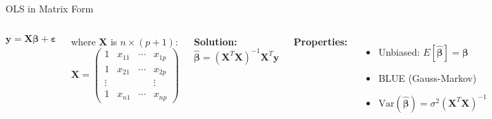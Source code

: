 \documentclass[aspectratio=169, 11pt]{beamer}
\begin{document}
\begin{frame}{OLS in Matrix Form}
\begin{columns}
$$\mathbf{y} = \mathbf{X}\boldsymbol{\beta} + \boldsymbol{\varepsilon}$$

\vspace{0.3em}
where $\mathbf{X}$ is $n \times (p+1)$:
$$\mathbf{X} = \begin{pmatrix} 1 & x_{11} & \cdots & x_{1p} \\ 1 & x_{21} & \cdots & x_{2p} \\ \vdots & & & \vdots \\ 1 & x_{n1} & \cdots & x_{np} \end{pmatrix}$$

\textbf{Solution:}
$$\hat{\boldsymbol{\beta}} = (\mathbf{X}^T\mathbf{X})^{-1}\mathbf{X}^T\mathbf{y}$$

\vspace{0.5em}
\textbf{Properties:}
\begin{itemize}
  \item Unbiased: $E[\hat{\boldsymbol{\beta}}] = \boldsymbol{\beta}$
  \item BLUE (Gauss-Markov)
  \item $\text{Var}(\hat{\boldsymbol{\beta}}) = \sigma^2(\mathbf{X}^T\mathbf{X})^{-1}$
\end{itemize}
\end{columns}
\end{frame}
\end{document}
